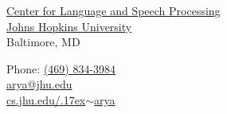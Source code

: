 \documentclass[margin, 10pt]{res} %
\author{Arya D. McCarthy}
\date{\oldstylenums{\today}}
\newcommand{\CLSP}{\href{https://www.clsp.jhu.edu}{Center for Language and Speech Processing}}
\begin{document}

\begin{minipage}{0.6180339887498949\textwidth}
\begin{flushright}
  \CLSP\\
  \href{https://www.jhu.edu/}{Johns Hopkins University}\\
  Baltimore, MD%
  \end{flushright}
\end{minipage}%
\begin{minipage}{0.3819660112501051\textwidth}
  \begin{flushright}
      Phone: \href{tel:+14698343984}{\textsc{(469) 834-3984}}\\
      \href{mailto:arya@jhu.edu}{\textsf{arya@jhu.edu}}\\
      \href{https://cs.jhu.edu/~arya}{\textsf{cs.jhu.edu/{\raise.17ex\hbox{$\scriptstyle\mathtt{\sim}$}}arya}}
  \end{flushright}
\end{minipage}
\end{document}
